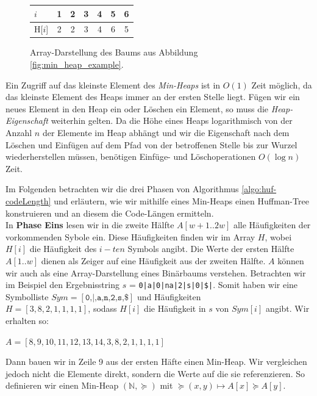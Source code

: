\documentclass[a4paper,11pt]{scrartcl}%
\theoremstyle{change}
\theoremstyle{nonumberplain}
\theoremstyle{change}
\theoremstyle{nonumberplain}
\theoremstyle{change}
\theoremstyle{nonumberplain}
\begin{document}
\begin{figure}[h]
	\centering
	
		\begin{tabular}[h]{|l|c|c|c|c|c|c|}\hline
			$i$ & 1 & 2 & 3 & 4 & 5 & 6\\ \hline
		   H[$i$] & 2 & 2 & 3 & 4 & 6 & 5\\ \hline
		   
		\end{tabular} 
		\caption{Array-Darstellung des Baums aus Abbildung \ref{fig:min_heap_example}.}
		\label{fig:array_heap}
\end{figure}

Ein Zugriff auf das kleinste Element des \textit{Min-Heaps} ist in $O(1)$ Zeit möglich, da das kleinste Element des Heaps immer an der ersten Stelle liegt.
Fügen wir ein neues Element in den Heap ein oder Löschen ein Element, so muss die \textit{Heap-Eigenschaft} weiterhin gelten. Da die Höhe eines Heaps logarithmisch von der Anzahl $n$ der Elemente im Heap abhängt und wir die Eigenschaft nach dem Löschen und Einfügen auf dem Pfad von der betroffenen Stelle bis zur Wurzel wiederherstellen müssen, benötigen Einfüge- und Löschoperationen $O(\log n)$ Zeit. \cite[S.115ff]{introductionToAlgorithms}
\vspace{40px}

Im Folgenden betrachten wir die drei Phasen von Algorithmus \ref{algo:huf-codeLength} und erläutern, wie wir mithilfe eines Min-Heaps einen Huffman-Tree konstruieren und an diesem die Code-Längen ermitteln. \\
In \textbf{Phase Eins} lesen wir in die zweite Hälfte $A[w+1..2w]$ alle Häufigkeiten der vorkommenden Sybole ein. Diese Häufigkeiten finden wir im Array $H$, wobei $H[i]$ die Häufigkeit des $i-ten$ Symbols angibt. Die Werte der ersten Hälfte $A[1..w]$ dienen als Zeiger auf eine Häufigkeit aus der zweiten Hälfte. $A$ können wir auch als eine Array-Darstellung eines Binärbaums verstehen. Betrachten wir im Beispiel den Ergebnisstring $s$ = \texttt{0|a|0|na|2|s|0|\$|}. Somit haben wir eine Symbolliste $Sym = [\texttt{0,|,a,n,2,s,\$}]$ und Häufigkeiten \\$H =[3,8,2,1,1,1,1] $, sodass $H[i]$ die Häufigkeit in $s$ von $Sym[i]$ angibt. Wir erhalten so:
\begin{center}
	$A = [8,9,10,11,12,13,14,3,8,2,1,1,1,1]$
\end{center}

Dann bauen wir in Zeile 9 aus der ersten Häfte einen Min-Heap. Wir vergleichen jedoch nicht die Elemente direkt, sondern die Werte auf die sie referenzieren. So definieren wir einen Min-Heap $(\mathbb{N}, \succeq)$ mit $\succeq(x,y) \mapsto A[x] \succeq A[y]$.
\end{document}
